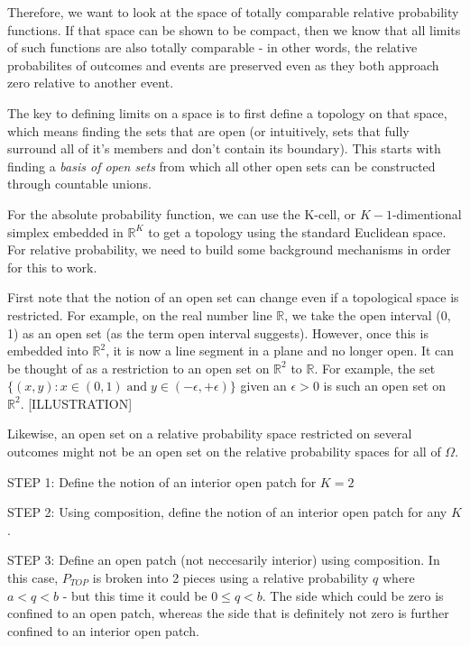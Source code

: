 \documentclass[twoside]{article}
\begin{document}
Therefore, we want to look at the space of totally comparable relative probability functions. If that space can be shown to be compact, then we know that all limits of such functions are also totally comparable - in other words, the relative probabilites of outcomes and events are preserved even as they both approach zero relative to another event.

The key to defining limits on a space is to first define a topology on that space, which means finding the sets that are open (or intuitively, sets that fully surround all of it's members and don't contain its boundary). This starts with finding a \textit{basis of open sets} from which all other open sets can be constructed through countable unions.

For the absolute probability function, we can use the K-cell, or \(K-1\)-dimentional simplex embedded in \(\mathbb{R}^K\) to get a topology using the standard Euclidean space. For relative probability, we need to build some background mechanisms in order for this to work.

First note that the notion of an open set can change even if a topological space is restricted. For example, on the real number line \(\mathbb{R}\), we take the open interval (0, 1) as an open set (as the term open interval suggests). However, once this is embedded into \(\mathbb{R}^2\), it is now a line segment in a plane and no longer open. It can be thought of as a restriction to an open set on \(\mathbb{R}^2\) to \(\mathbb{R}\). For example, the set \(\{(x, y): x \in (0, 1)\;  \text{and}\;  y \in (-\epsilon, +\epsilon)\}\) given an \(\epsilon > 0\) is such an open set on \(\mathbb{R}^2\). [ILLUSTRATION]

Likewise, an open set on a relative probability space restricted on several outcomes might not be an open set on the relative probability spaces for all of \(\Omega\).

STEP 1: Define the notion of an interior open patch for \(K = 2\)

STEP 2: Using composition, define the notion of an interior open patch for any \(K\).

STEP 3: Define an open patch (not neccesarily interior) using composition. In this case, \(P_{TOP}\) is broken into 2 pieces using a relative probability \(q\) where \(a < q < b\) - but this time it could be \(0 \leq q < b\). The side which could be zero is confined to an open patch, whereas the side that is definitely not zero is further confined to an interior open patch.
\end{document}

